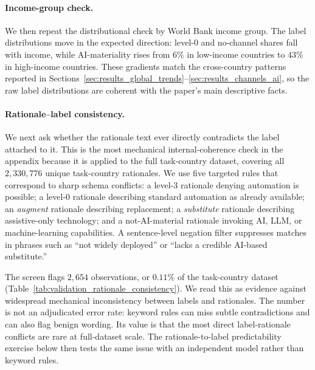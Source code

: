 \documentclass[11pt]{article}
\begin{document}
\paragraph{Income-group check.} We then repeat the distributional check by World Bank income group. The label distributions move in the expected direction: level-0 and no-channel shares fall with income, while AI-materiality rises from $6\%$ in low-income countries to $43\%$ in high-income countries. These gradients match the cross-country patterns reported in Sections~\ref{sec:results_global_trends}--\ref{sec:results_channels_ai}, so the raw label distributions are coherent with the paper's main descriptive facts.

\paragraph{Rationale--label consistency.} We next ask whether the rationale text ever directly contradicts the label attached to it. This is the most mechanical internal-coherence check in the appendix because it is applied to the full task-country dataset, covering all $2{,}330{,}776$ unique task-country rationales. We use five targeted rules that correspond to sharp schema conflicts: a level-3 rationale denying automation is possible; a level-0 rationale describing standard automation as already available; an \textit{augment} rationale describing replacement; a \textit{substitute} rationale describing assistive-only technology; and a not-AI-material rationale invoking AI, LLM, or machine-learning capabilities. A sentence-level negation filter suppresses matches in phrases such as ``not widely deployed'' or ``lacks a credible AI-based substitute.''

The screen flags $2{,}654$ observations, or $0.11\%$ of the task-country dataset (Table~\ref{tab:validation_rationale_consistency}). We read this as evidence against widespread mechanical inconsistency between labels and rationales. The number is not an adjudicated error rate: keyword rules can miss subtle contradictions and can also flag benign wording. Its value is that the most direct label-rationale conflicts are rare at full-dataset scale. The rationale-to-label predictability exercise below then tests the same issue with an independent model rather than keyword rules.
\end{document}

